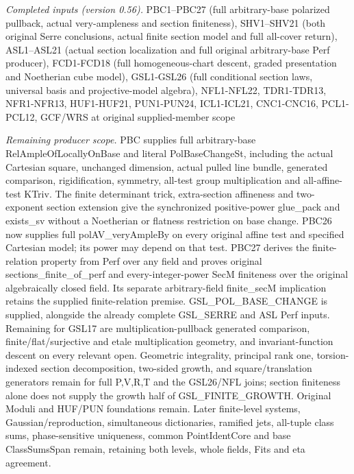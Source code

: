 \documentclass[11pt,a4paper]{article}
\numberwithin{equation}{section}
\theoremstyle{remark}\newtheorem{remark}[theorem]{Remark}
\begin{document}
\emph{Completed inputs (version 0.56).} PBC1–PBC27 (full arbitrary-base polarized pullback, actual very-ampleness and section finiteness), SHV1–SHV21 (both original Serre conclusions, actual finite section model and full all-cover return), ASL1–ASL21 (actual section localization and full original arbitrary-base Perf producer), FCD1-FCD18 (full homogeneous-chart descent, graded presentation and Noetherian cube model), GSL1-GSL26 (full conditional section laws, universal basis and projective-model algebra), NFL1-NFL22, TDR1-TDR13, NFR1-NFR13, HUF1-HUF21, PUN1-PUN24, ICL1-ICL21, CNC1-CNC16, PCL1-PCL12, GCF/WRS at original supplied-member scope

\emph{Remaining producer scope.} PBC supplies full arbitrary-base RelAmpleOfLocallyOnBase and literal PolBaseChangeSt, including the actual Cartesian square, unchanged dimension, actual pulled line bundle, generated comparison, rigidification, symmetry, all-test group multiplication and all-affine-test KTriv. The finite determinant trick, extra-section affineness and two-exponent section extension give the synchronized positive-power glue\_\allowbreak pack and exists\_\allowbreak sv without a Noetherian or flatness restriction on base change. PBC26 now supplies full polAV\_\allowbreak veryAmpleBy on every original affine test and specified Cartesian model; its power may depend on that test. PBC27 derives the finite-relation property from Perf over any field and proves original sections\_\allowbreak finite\_\allowbreak of\_\allowbreak perf and every-integer-power SecM finiteness over the original algebraically closed field. Its separate arbitrary-field finite\_\allowbreak secM implication retains the supplied finite-relation premise. GSL\_\allowbreak POL\_\allowbreak BASE\_\allowbreak CHANGE is supplied, alongside the already complete GSL\_\allowbreak SERRE and ASL Perf inputs. Remaining for GSL17 are multiplication-pullback generated comparison, finite/flat/surjective and etale multiplication geometry, and invariant-function descent on every relevant open. Geometric integrality, principal rank one, torsion-indexed section decomposition, two-sided growth, and square/translation generators remain for full P,V,R,T and the GSL26/NFL joins; section finiteness alone does not supply the growth half of GSL\_\allowbreak FINITE\_\allowbreak GROWTH. Original Moduli and HUF/PUN foundations remain. Later finite-level systems, Gaussian/reproduction, simultaneous dictionaries, ramified jets, all-tuple class sums, phase-sensitive uniqueness, common PointIdentCore and base ClassSumsSpan remain, retaining both levels, whole fields, Fits and eta agreement.
\end{document}
